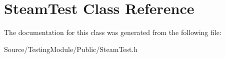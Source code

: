 \hypertarget{class_steam_test}{}\section{Steam\+Test Class Reference}
\label{class_steam_test}


The documentation for this class was generated from the following file\+:\begin{DoxyCompactItemize}
\item 
Source/\+Testing\+Module/\+Public/Steam\+Test.\+h\end{DoxyCompactItemize}
